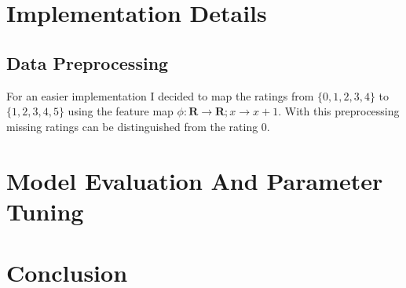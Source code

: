 \documentclass[DIV=14,twocolumn]{scrartcl}
\begin{document}
\section{Implementation Details}

\subsection{Data Preprocessing}
For an easier implementation I decided to map the ratings from $\{0,1,2,3,4\}$ to $\{1,2,3,4,5\}$ using the feature map $\phi:\mathbf{R}\rightarrow\mathbf{R};x\rightarrow x + 1$. With this preprocessing missing ratings can be distinguished from the rating 0.



\section{Model Evaluation And Parameter Tuning}

\section{Conclusion}
{}

\end{document}
